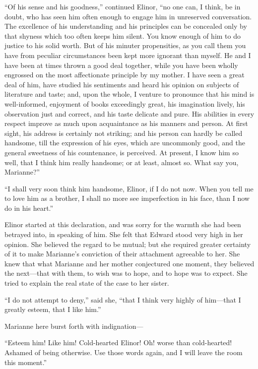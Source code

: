 ``Of his sense and his goodness,'' continued Elinor,
``no one can, I think, be in doubt, who has seen him
often enough to engage him in unreserved conversation.
The excellence of his understanding and his principles
can be concealed only by that shyness which too often
keeps him silent.  You know enough of him to do justice
to his solid worth.  But of his minuter propensities,
as you call them you have from peculiar circumstances
been kept more ignorant than myself.  He and I have
been at times thrown a good deal together, while you
have been wholly engrossed on the most affectionate
principle by my mother.  I have seen a great deal of him,
have studied his sentiments and heard his opinion on
subjects of literature and taste; and, upon the whole,
I venture to pronounce that his mind is well-informed,
enjoyment of books exceedingly great, his imagination lively,
his observation just and correct, and his taste delicate
and pure.  His abilities in every respect improve
as much upon acquaintance as his manners and person.
At first sight, his address is certainly not striking;
and his person can hardly be called handsome, till the
expression of his eyes, which are uncommonly good,
and the general sweetness of his countenance, is perceived.
At present, I know him so well, that I think him
really handsome; or at least, almost so.  What say you,
Marianne?''

``I shall very soon think him handsome, Elinor, if I
do not now.  When you tell me to love him as a brother,
I shall no more see imperfection in his face, than I now do
in his heart.''

Elinor started at this declaration, and was sorry for
the warmth she had been betrayed into, in speaking of him.
She felt that Edward stood very high in her opinion.
She believed the regard to be mutual; but she required
greater certainty of it to make Marianne's conviction
of their attachment agreeable to her.  She knew that
what Marianne and her mother conjectured one moment,
they believed the next---that with them, to wish was to hope,
and to hope was to expect.  She tried to explain the real
state of the case to her sister.

``I do not attempt to deny,'' said she, ``that I think
very highly of him---that I greatly esteem, that I like him.''

Marianne here burst forth with indignation---%

``Esteem him! Like him! Cold-hearted Elinor! Oh!
worse than cold-hearted! Ashamed of being otherwise.
Use those words again, and I will leave the room this moment.''


